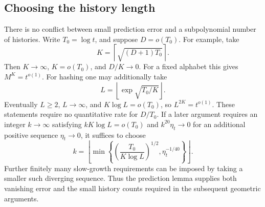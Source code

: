 \subsection{Choosing the history length}

There is no conflict between small prediction error and a subpolynomial
number of histories.  Write \(T_0=\log t\), and suppose \(D=o(T_0)\).
For example, take
\[
 K=\left\lceil\sqrt{(D+1)T_0}\right\rceil.
\]
Then \(K\to\infty\), \(K=o(T_0)\), and \(D/K\to0\).
For a fixed alphabet this gives \(M^K=t^{o(1)}\).
For hashing one may additionally take
\[
 L=\left\lfloor\exp\sqrt{T_0/K}\right\rfloor.
\]
Eventually \(L\ge2\), \(L\to\infty\), and
\(K\log L=o(T_0)\), so \(L^{2K}=t^{o(1)}\).
These statements require no quantitative rate for \(D/T_0\).
If a later argument requires an integer \(k\to\infty\) satisfying
\(kK\log L=o(T_0)\) and \(k^{20}\eta_t\to0\) for an additional positive
sequence \(\eta_t\to0\), it suffices to choose
\[
 k=\left\lfloor\min\left\{
       \left(\frac{T_0}{K\log L}\right)^{1/2},
       \eta_t^{-1/40}\right\}\right\rfloor.
\]
Further finitely many slow-growth requirements can be imposed by taking a
smaller such diverging sequence.  Thus the prediction lemma supplies both
vanishing error and the small history counts required in the subsequent
geometric arguments.
